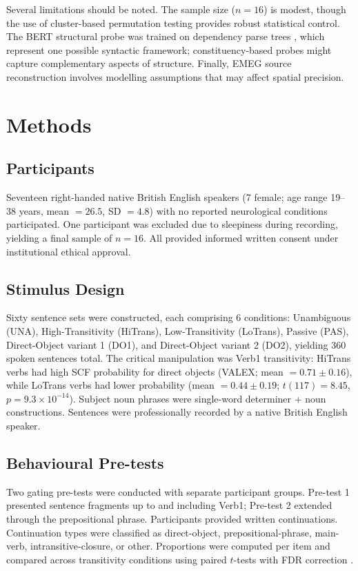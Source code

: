 \documentclass[11pt]{article}
\begin{document}
Several limitations should be noted. The sample size ($n = 16$) is modest, though the use of cluster-based permutation testing provides robust statistical control. The BERT structural probe was trained on dependency parse trees \citep{demarneffe2006generating}, which represent one possible syntactic framework; constituency-based probes might capture complementary aspects of structure. Finally, EMEG source reconstruction involves modelling assumptions that may affect spatial precision.

\section{Methods}

\subsection{Participants}
Seventeen right-handed native British English speakers (7 female; age range 19--38 years, mean $= 26.5$, SD $= 4.8$) with no reported neurological conditions participated. One participant was excluded due to sleepiness during recording, yielding a final sample of $n = 16$. All provided informed written consent under institutional ethical approval.

\subsection{Stimulus Design}
Sixty sentence sets were constructed, each comprising 6 conditions: Unambiguous (UNA), High-Transitivity (HiTrans), Low-Transitivity (LoTrans), Passive (PAS), Direct-Object variant 1 (DO1), and Direct-Object variant 2 (DO2), yielding 360 spoken sentences total. The critical manipulation was Verb1 transitivity: HiTrans verbs had high SCF probability for direct objects (VALEX; mean $= 0.71 \pm 0.16$), while LoTrans verbs had lower probability (mean $= 0.44 \pm 0.19$; $t(117) = 8.45$, $p = 9.3 \times 10^{-14}$). Subject noun phrases were single-word determiner + noun constructions. Sentences were professionally recorded by a native British English speaker.

\subsection{Behavioural Pre-tests}
Two gating pre-tests were conducted with separate participant groups. Pre-test 1 presented sentence fragments up to and including Verb1; Pre-test 2 extended through the prepositional phrase. Participants provided written continuations. Continuation types were classified as direct-object, prepositional-phrase, main-verb, intransitive-closure, or other. Proportions were computed per item and compared across transitivity conditions using paired $t$-tests with FDR correction \citep{benjamini1995controlling}.
\end{document}
